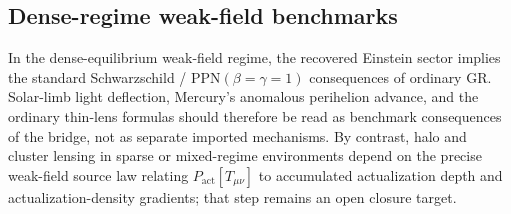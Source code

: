 \subsection{Dense-regime weak-field benchmarks}
\label{sec:dense_weak_field_benchmarks}

In the dense-equilibrium weak-field regime, the recovered Einstein sector implies the standard Schwarzschild / PPN$(\beta=\gamma=1)$ consequences of ordinary GR. Solar-limb light deflection, Mercury's anomalous perihelion advance, and the ordinary thin-lens formulas should therefore be read as benchmark consequences of the bridge, not as separate imported mechanisms. By contrast, halo and cluster lensing in sparse or mixed-regime environments depend on the precise weak-field source law relating $P_{\mathrm{act}}[T_{\mu\nu}]$ to accumulated actualization depth and actualization-density gradients; that step remains an open closure target.

